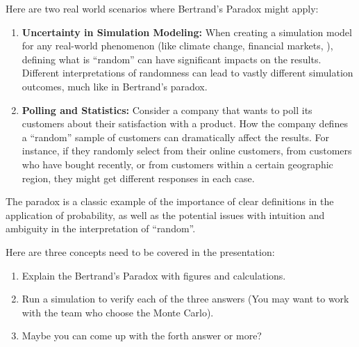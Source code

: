 \documentclass{article}
\theoremstyle{definition}
\theoremstyle{remark}
\begin{document}
Here are two real world scenarios where Bertrand's Paradox might apply:
\begin{enumerate}
    \item \textbf{Uncertainty in Simulation Modeling:} When creating a simulation model for any real-world phenomenon (like climate change, financial markets, \etc), defining what is ``random'' can have significant impacts on the results. Different interpretations of randomness can lead to vastly different simulation outcomes, much like in Bertrand's paradox.
    \item \textbf{Polling and Statistics:} Consider a company that wants to poll its customers about their satisfaction with a product. How the company defines a ``random'' sample of customers can dramatically affect the results. For instance, if they randomly select from their online customers, from customers who have bought recently, or from customers within a certain geographic region, they might get different responses in each case.
\end{enumerate}

The paradox is a classic example of the importance of clear definitions in the application of probability, as well as the potential issues with intuition and ambiguity in the interpretation of ``random''.

Here are three concepts need to be covered in the presentation:
\begin{enumerate}
    \item Explain the Bertrand's Paradox with figures and calculations.
    \item Run a simulation to verify each of the three answers (You may want to work with the team who choose the Monte Carlo).
    \item Maybe you can come up with the forth answer or more?
\end{enumerate}
\end{document}
